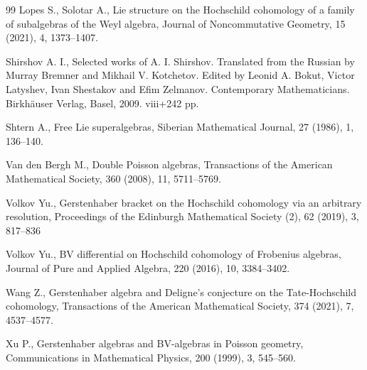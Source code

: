 \documentclass[secthm,seceqn,amsthm,ussrhead,reqno,12pt]{amsart}
\theoremstyle{plain}
\begin{document}
\begin{thebibliography}{99}
Lopes S.,   Solotar A., 
Lie structure on the Hochschild cohomology of a family of subalgebras of the Weyl algebra, 
Journal of Noncommutative Geometry, 15 (2021), 4, 1373--1407.
 
 
 
 Shirshov A. I.,  
 Selected works of A. I. Shirshov. Translated from the Russian by Murray Bremner and Mikhail V. Kotchetov. Edited by Leonid A. Bokut, Victor Latyshev, Ivan Shestakov and Efim Zelmanov. Contemporary Mathematicians. Birkhäuser Verlag, Basel, 2009. viii+242 pp.
 
 
 Shtern A., 
Free Lie superalgebras,
Siberian Mathematical Journal, 27 (1986),  1, 136--140.


Van den Bergh M., 
Double Poisson algebras, 
Transactions of the American Mathematical Society, 360  (2008), 11, 5711--5769.


 Volkov Yu.,  
 Gerstenhaber bracket on the Hochschild cohomology via an arbitrary resolution, 
 Proceedings of the Edinburgh Mathematical Society (2), 62 (2019),  3, 817--836
 
 Volkov Yu.,  
 BV differential on Hochschild cohomology of Frobenius algebras,  
 Journal of Pure and Applied Algebra, 220 (2016),  10, 3384--3402. 

Wang Z., 
Gerstenhaber algebra and Deligne's conjecture on the Tate-Hochschild cohomology, 
Transactions of the American Mathematical Society, 374 (2021),  7, 4537--4577.

Xu P., 
Gerstenhaber algebras and BV-algebras in Poisson geometry,  
Communications in Mathematical Physics, 200 (1999),  3, 545--560.

 
 
  
 
\end{thebibliography}
\end{document}

